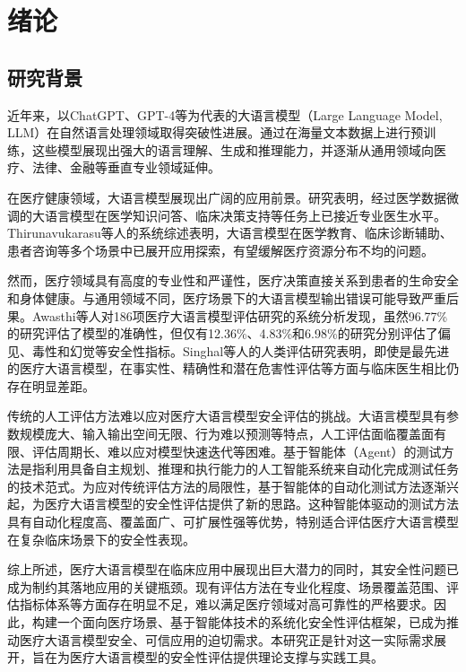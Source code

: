 
\chapter{绪论}
\label{cha:intro}

\section{研究背景}
\label{sec:background}

近年来，以ChatGPT、GPT-4等为代表的大语言模型（Large Language Model, LLM）在自然语言处理领域取得突破性进展\cite{brown2020language,achiam2023gpt}。通过在海量文本数据上进行预训练，这些模型展现出强大的语言理解、生成和推理能力，并逐渐从通用领域向医疗、法律、金融等垂直专业领域延伸。

在医疗健康领域，大语言模型展现出广阔的应用前景。研究表明，经过医学数据微调的大语言模型在医学知识问答、临床决策支持等任务上已接近专业医生水平\cite{singhal2023large}。Thirunavukarasu等人\cite{thirunavukarasu2023large}的系统综述表明，大语言模型在医学教育、临床诊断辅助、患者咨询等多个场景中已展开应用探索，有望缓解医疗资源分布不均的问题\cite{yang2023large,nazi2024large}。

然而，医疗领域具有高度的专业性和严谨性，医疗决策直接关系到患者的生命安全和身体健康。与通用领域不同，医疗场景下的大语言模型输出错误可能导致严重后果。Awasthi等人\cite{awasthi2025human}对186项医疗大语言模型评估研究的系统分析发现，虽然96.77\%的研究评估了模型的准确性，但仅有12.36\%、4.83\%和6.98\%的研究分别评估了偏见、毒性和幻觉等安全性指标。Singhal等人\cite{singhal2023large}的人类评估研究表明，即使是最先进的医疗大语言模型，在事实性、精确性和潜在危害性评估等方面与临床医生相比仍存在明显差距。

传统的人工评估方法难以应对医疗大语言模型安全评估的挑战。大语言模型具有参数规模庞大、输入输出空间无限、行为难以预测等特点，人工评估面临覆盖面有限、评估周期长、难以应对模型快速迭代等困难\cite{liang2022holistic}。基于智能体（Agent）的测试方法是指利用具备自主规划、推理和执行能力的人工智能系统来自动化完成测试任务的技术范式。为应对传统评估方法的局限性，基于智能体的自动化测试方法逐渐兴起，为医疗大语言模型的安全性评估提供了新的思路\cite{wang2023survey}。这种智能体驱动的测试方法具有自动化程度高、覆盖面广、可扩展性强等优势，特别适合评估医疗大语言模型在复杂临床场景下的安全性表现。

综上所述，医疗大语言模型在临床应用中展现出巨大潜力的同时，其安全性问题已成为制约其落地应用的关键瓶颈。现有评估方法在专业化程度、场景覆盖范围、评估指标体系等方面存在明显不足，难以满足医疗领域对高可靠性的严格要求。因此，构建一个面向医疗场景、基于智能体技术的系统化安全性评估框架，已成为推动医疗大语言模型安全、可信应用的迫切需求。本研究正是针对这一实际需求展开，旨在为医疗大语言模型的安全性评估提供理论支撑与实践工具。

